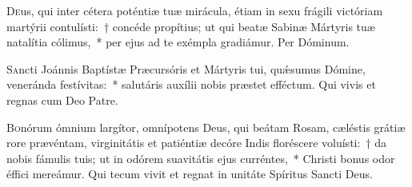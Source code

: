\documentclass[vesperale_romanum.tex]{subfiles}
\begin{document}
\oratio

\lettrine{D}{e}us, qui inter cétera poténtiæ tuæ mirácula, étiam in sexu frágili vi\-ctóriam martýrii contulísti:~† concéde propítius; ut qui beatæ Sabinæ Mártyris tuæ natalítia cólimus,~* per ejus ad te exémpla gradiámur. Per Dóminum.









\admagnificat



\oratio

\lettrine{S}{a}ncti Joánnis Baptístæ Præcursóris et Mártyris tui, quǽsumus Dómine, veneránda festívitas:~* salutáris auxílii nobis præstet effé\-ctum. Qui vivis et regnas cum Deo Patre.


\myrule


\duplex


\oratio

\lettrine{B}{o}nórum ó\-mnium largítor, omnípotens Deus, qui beátam Rosam, cæléstis grátiæ rore prævéntam, virginitátis et patiéntiæ decóre Indis floréscere voluísti:~† da nobis fámulis tuis; ut in odórem suavitátis ejus curréntes,~* Christi bonus odor éffici mereámur. Qui tecum vivit et regnat in unitáte Spíritus San\-cti Deus.

\end{document}
